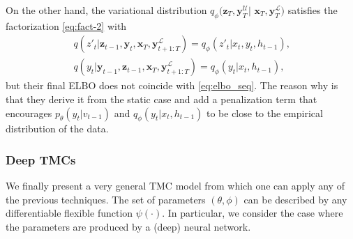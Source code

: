 \documentclass{article}
\def\x{{\mathbf x}}
\def\z{{\mathbf z}}
\def\y{{\mathbf y}}
\def\yl{{\mathbf y}_{T}^{\mathcal{L}}}
\def\yu{{\mathbf y}_{T}^{\mathcal{U}}}
\def\L{{\mathcal L}}
\def\E{{\mathbb{E}}}
\def\p{p_{\theta}}
\def\q{q_\phi}
\def\L{\mathcal{L}}
\def\U{\mathcal{U}}
\begin{document}
On the other hand, the variational distribution $\q(\z_T, \yu|$ $ \x_T, \yl)$ satisfies
the factorization \eqref{eq:fact-2}
with
\begin{align*}
 q(z'_t|\z_{t-1},\y_{t},\x_T,\y_{t+1:T}^{\L})=  \q(z'_t| x_t, y_t, h_{t-1})\text{,} \\
q(y_t|\y_{t-1},\z_{t-1},\x_T,\y_{t+1:T}^{\L})= \q(y_t| x_t, h_{t-1}) \text{,}
\end{align*}
but their final ELBO does not
coincide with \eqref{eq:elbo_seq}. 
The reason why is that they derive it from the static case and add a penalization term that encourages $\p(y_t|v_{t-1})$ and $\q(y_t| x_t, h_{t-1})$ to be close to the empirical distribution of the data.




\subsubsection{Deep TMCs}
We finally present a very general TMC model from which one can apply any of the previous techniques.
The set of parameters $(\theta, \phi)$  
can be described by any differentiable flexible function $\psi(\cdot)$. 
In particular, we consider the case where the parameters are
produced by a (deep) neural network. 
\end{document}
